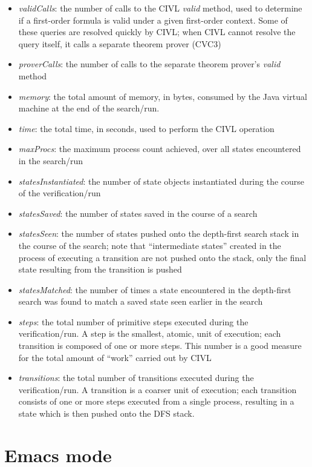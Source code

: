 \begin{itemize}
\item \emph{validCalls}: the number of calls to the CIVL \emph{valid}
  method, used to determine if a first-order formula is valid under
  a given first-order context.   Some of these queries are resolved
  quickly by CIVL; when CIVL cannot resolve the query itself, it
  calls a separate theorem prover (CVC3)
\item \emph{proverCalls}: the number of calls to the separate theorem
  prover's \emph{valid} method
\item \emph{memory}: the total amount of memory, in bytes, consumed by
  the Java virtual machine at the end of the search/run.
\item \emph{time}: the total time, in seconds, used to perform the
  CIVL operation
\item \emph{maxProcs}: the maximum process count achieved, over all states 
  encountered in the search/run
\item \emph{statesInstantiated}: the number of state objects
  instantiated during the course of the verification/run
\item \emph{statesSaved}: the number of states saved in the course
  of a search
\item \emph{statesSeen}: the number of states pushed onto the 
  depth-first search stack in the course of the search; note
  that ``intermediate states'' created in the process of executing
  a transition are not pushed onto the stack, only the final
  state resulting from the transition is pushed
\item \emph{statesMatched}: the number of times a state encountered
  in the depth-first search was found to match a saved state seen
  earlier in the search
\item \emph{steps}: the total number of primitive steps executed
  during the verification/run.  A step is the smallest, atomic,
  unit of execution; each transition is composed of one or more steps.
  This number is a good measure for the total amount of ``work''
  carried out by CIVL
\item \emph{transitions}: the total number of transitions executed
  during the verification/run.  A transition is a coarser unit
  of execution; each transition consists of one or more steps 
  executed from a single process, resulting in a state which is then
  pushed onto the DFS stack.
\end{itemize}

\chapter{Emacs mode}

